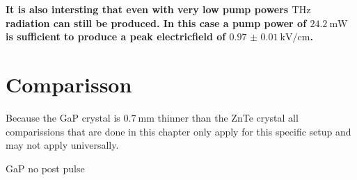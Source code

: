 \textbf{It is also intersting that even with very low pump powers $\si{\tera\hertz}$ radiation can still be produced.
In this case a pump power of $\SI{24.2}{\milli\W}$ is sufficient to produce a peak electricfield of $\SI{0.97(1)}{\kilo\V\per\centi\meter}$.}

\FloatBarrier
\section{Comparisson}
Because the GaP crystal is $\SI{0.7}{\milli\meter}$ thinner than the ZnTe crystal all comparissions that are done in this chapter only apply for this specific setup and may not apply universally.


GaP no post pulse
